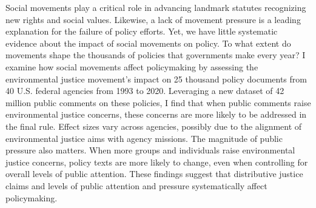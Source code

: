 Social movements play a critical role in advancing landmark statutes recognizing new rights and social values. Likewise, a lack of movement pressure is a leading explanation for the failure of policy efforts. Yet, we have little systematic evidence about the impact of social movements on policy. To what extent do movements shape the thousands of policies that governments make every year? I examine how social movements affect policymaking by assessing the environmental justice movement's impact on 25 thousand policy documents from 40 U.S. federal agencies from 1993 to 2020.  Leveraging a new dataset of 42 million public comments on these policies, I find that when public comments raise environmental justice concerns, these concerns are more likely to be addressed in the final rule. Effect sizes vary across agencies, possibly due to the alignment of environmental justice aims with agency missions.
The magnitude of public pressure also matters. When more groups and individuals raise environmental justice concerns, policy texts are more likely to change, even when controlling for overall levels of public attention. These findings suggest that distributive justice claims and levels of public attention and pressure systematically affect policymaking.
